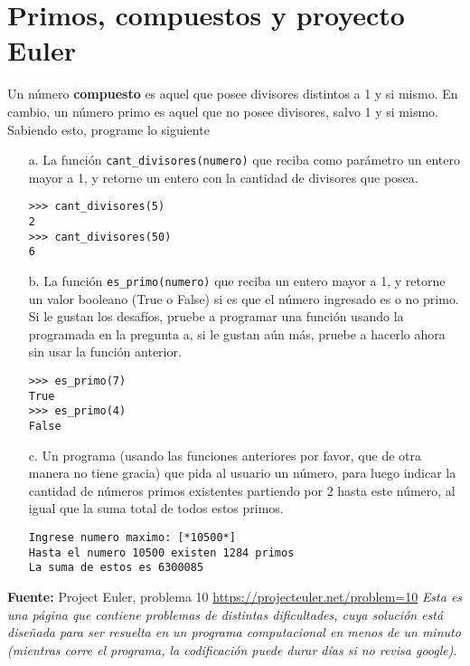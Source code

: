 \section{Primos, compuestos y proyecto Euler}

Un número \textbf{compuesto} es aquel que posee divisores distintos a 1 y si mismo. En cambio, un número primo es aquel que no posee divisores, salvo 1 y si mismo. Sabiendo esto, programe lo siguiente
\begin{enumerate}
    \item[a.] La función \texttt{cant\_divisores(numero)} que reciba como parámetro un entero mayor a 1, y retorne un entero con la cantidad de divisores que posea.
\begin{lstlisting}[style=consola]
>>> cant_divisores(5)
2
>>> cant_divisores(50)
6
\end{lstlisting}
    \item[b.] La función \texttt{es\_primo(numero)} que reciba un entero mayor a 1, y retorne un valor booleano (True o False) si es que el número ingresado es o no primo. Si le gustan los desafíos, pruebe a programar una función usando la programada en la pregunta a, si le gustan aún más, pruebe a hacerlo ahora sin usar la función anterior.
\begin{lstlisting}[style=consola]
>>> es_primo(7)
True
>>> es_primo(4)
False
\end{lstlisting}
    \item[c.] Un programa (usando las funciones anteriores por favor, que de otra manera no tiene gracia) que pida al usuario un número, para luego indicar la cantidad de números primos existentes partiendo por 2 hasta este número, al igual que la suma total de todos estos primos.
\begin{lstlisting}[style=consola]
Ingrese numero maximo: [*10500*]
Hasta el numero 10500 existen 1284 primos
La suma de estos es 6300085
\end{lstlisting}
\end{enumerate}

\textbf{Fuente:} Project Euler, problema 10 \url{https://projecteuler.net/problem=10} \textit{Esta es una página que contiene problemas de distintas dificultades, cuya solución está diseñada para ser resuelta en un programa computacional en menos de un minuto (mientras corre el programa, la codificación puede durar días si no revisa google)}.